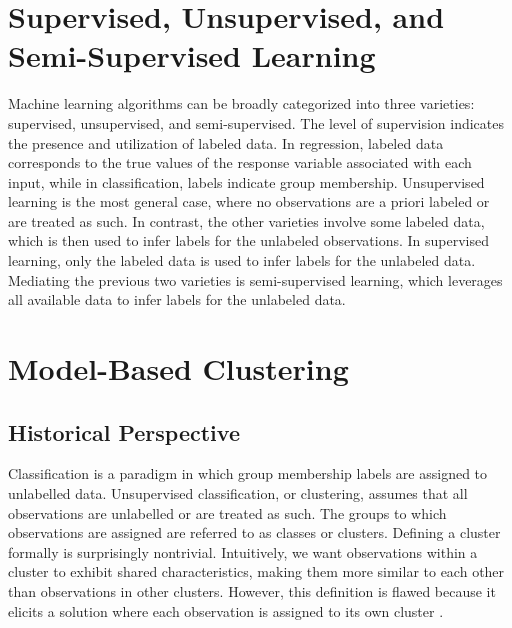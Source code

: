 \documentclass[12pt]{report}
\begin{document}
\section{Supervised, Unsupervised, and Semi-Supervised Learning}
Machine learning algorithms can be broadly categorized into three varieties: supervised, unsupervised, and semi-supervised. The level of supervision indicates the presence and utilization of labeled data. In regression, labeled data corresponds to the true values of the response variable associated with each input, while in classification, labels indicate group membership. Unsupervised learning is the most general case, where no observations are a priori labeled or are treated as such. In contrast, the other varieties involve some labeled data, which is then used to infer labels for the unlabeled observations. In supervised learning, only the labeled data is used to infer labels for the unlabeled data. Mediating the previous two varieties is semi-supervised learning, which leverages all available data to infer labels for the unlabeled data. 



\section{Model-Based Clustering}



\subsection{Historical Perspective}
Classification is a paradigm in which group membership labels are assigned to unlabelled data. Unsupervised classification, or clustering, assumes that all observations are unlabelled or are treated as such. The groups to which observations are assigned are referred to as classes or clusters. Defining a cluster formally is surprisingly nontrivial. Intuitively, we want observations within a cluster to exhibit shared characteristics, making them more similar to each other than observations in other clusters. 
However, this definition is flawed because it elicits a solution where each observation is assigned to its own cluster \citet{mcnicholas2016a}. 
\end{document}
